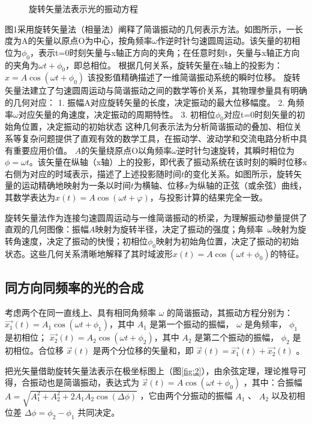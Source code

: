 \documentclass[withoutpreface,bwprint]{cumcmthesis} %
\begin{document}
\begin{appendices}
\begin{figure}[!h]
        \caption{旋转矢量法表示光的振动方程}
        \label{fig:1}
    \end{figure}

    图1采用旋转矢量法（相量法）阐释了简谐振动的几何表示方法。如图所示，一长度为A的矢量以原点O为中心，按角频率$\omega$作逆时针匀速圆周运动。该矢量的初相位为$\phi_0$，表示t=0时刻矢量与x轴正方向的夹角；在任意时刻t，矢量与x轴正方向的夹角为$\omega t+\phi_0$，即总相位。
    根据几何关系，旋转矢量在x轴上的投影为： $x=A\cos(\omega t+\phi_0)$
    该投影值精确描述了一维简谐振动系统的瞬时位移。
    旋转矢量法建立了匀速圆周运动与简谐振动之间的数学等价关系，其物理参量具有明确的几何对应：
    1.	振幅A对应旋转矢量的长度，决定振动的最大位移幅度。
    2.	角频率$\omega$对应矢量的角速度，决定振动的周期特性。
    3.	初相位$\phi_0$对应t=0时刻矢量的初始角位置，决定振动的初始状态
    这种几何表示法为分析简谐振动的叠加、相位关系等复杂问题提供了直观有效的数学工具，在振动学、波动学和交流电路分析中具有重要应用价值。
    $A$的矢量绕原点O以角频率$\omega$逆时针匀速旋转，其瞬时相位为$\phi=\omega t$。该矢量在纵轴（x轴）上的投影，即代表了振动系统在该时刻的瞬时位移x右侧为对应的时域表示，描述了上述投影随时间$t$的变化关系。如图所示，旋转矢量的运动精确地映射为一条以时间$t$为横轴、位移$x$为纵轴的正弦（或余弦）曲线，其数学表达为$x(t)=A\cos(\omega t+\varphi)$，与投影计算的结果完全一致。

    旋转矢量法作为连接匀速圆周运动与一维简谐振动的桥梁，为理解振动参量提供了直观的几何图像：振幅$A$映射为旋转半径，决定了振动的强度；角频率 $\omega$映射为旋转角速度，决定了振动的快慢；初相位$\phi_0$映射为初始角位置，决定了振动的初始状态。这些几何关系清晰地解释了其时域波形$x(t)=A\cos(\omega t+\phi_0)$的特征。

    \subsection{同方向同频率的光的合成}
    考虑两个在同一直线上、具有相同角频率 $\omega$ 的简谐振动，其振动方程分别为：
    $ \overrightarrow{x_1}(t) = A_1 \cos(\omega t + \phi_{1})$，其中 $A_1$ 是第一个振动的振幅， $\omega$ 是角频率， $\phi_{1}$ 是初相位；
    $\overrightarrow{x_2}(t) = A_2 \cos(\omega t + \phi_{2})$，其中 $A_2$ 是第二个振动的振幅， $\phi_{2}$ 是初相位。合位移 $\overrightarrow{x}(t)$ 是两个分位移的矢量和，即 $\overrightarrow{x}(t) = \overrightarrow{x_1}(t) + \overrightarrow{x_2}(t)$ 。

    把光矢量借助旋转矢量法表示在极坐标图上（图\ref{fig:2}），由余弦定理，理论推导可得，合振动也是简谐振动，表达式为 $\overrightarrow{x}(t) = A \cos(\omega t + \phi_0)$ ，其中：合振幅 $A = \sqrt{A_1^2 + A_2^2 + 2 A_1 A_2 \cos(\Delta \phi)}$ ，它由两个分振动的振幅 $A_1$ 、 $A_2$ 以及初相位差 $\Delta \phi = \phi_{2} - \phi_{1}$ 共同决定。


\end{appendices}
\end{document}
